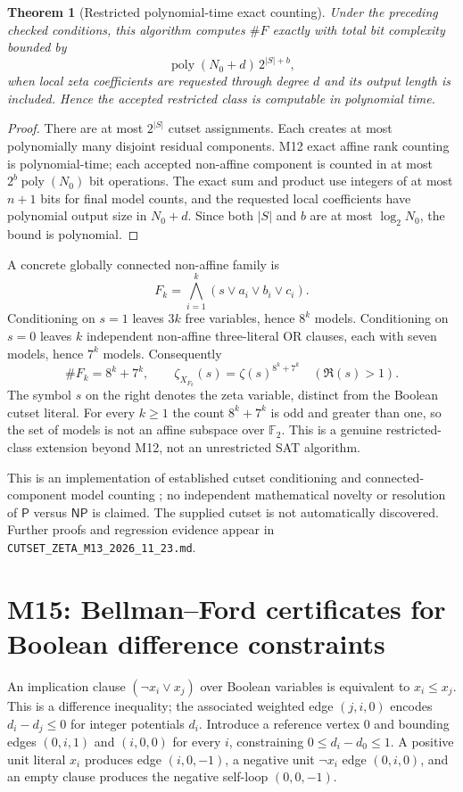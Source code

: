\documentclass[11pt,a4paper]{article}
\newtheorem{theorem}{Theorem}
\begin{document}
\begin{theorem}[Restricted polynomial-time exact counting]
Under the preceding checked conditions, this algorithm
computes $\#F$ exactly with total bit complexity bounded by
\[
\operatorname{poly}(N_0+d)\,2^{|S|+b},
\]
when local zeta coefficients are requested through degree
$d$ and its output length is included. Hence the accepted
restricted class is computable in polynomial time.
\end{theorem}
\begin{proof}
There are at most $2^{|S|}$ cutset assignments. Each creates
at most polynomially many disjoint residual components.
M12 exact affine rank counting is polynomial-time; each
accepted non-affine component is counted in at most
$2^b\operatorname{poly}(N_0)$ bit operations. The exact sum
and product use integers of at most $n+1$ bits for final
model counts, and the requested local coefficients have
polynomial output size in $N_0+d$. Since both $|S|$ and
$b$ are at most $\log_2N_0$, the bound is polynomial.
\end{proof}

A concrete globally connected non-affine family is
\[
F_k=\bigwedge_{i=1}^k
(s\lor a_i\lor b_i\lor c_i).
\]
Conditioning on $s=1$ leaves $3k$ free variables, hence
$8^k$ models. Conditioning on $s=0$ leaves $k$
independent non-affine three-literal OR clauses, each with
seven models, hence $7^k$ models. Consequently
\[
\#F_k=8^k+7^k,\qquad
\zeta_{X_{F_k}}(s)=\zeta(s)^{8^k+7^k}
\quad(\Re(s)>1).
\]
The symbol $s$ on the right denotes the zeta variable,
distinct from the Boolean cutset literal.
For every $k\ge1$ the count $8^k+7^k$ is odd and greater
than one, so the set of models is not an affine subspace
over $\mathbb F_2$. This is a genuine restricted-class
extension beyond M12, not an unrestricted SAT algorithm.

This is an implementation of established cutset
conditioning and connected-component model counting
\cite{bayardo,andorcutset}; no independent mathematical
novelty or resolution of $\mathsf P$ versus $\mathsf{NP}$
is claimed. The supplied cutset is not automatically
discovered. Further proofs and regression evidence appear
in \texttt{CUTSET\_ZETA\_M13\_2026\_11\_23.md}.

\section{M15: Bellman--Ford certificates for Boolean difference constraints}
An implication clause $(\neg x_i\lor x_j)$ over Boolean
variables is equivalent to $x_i\le x_j$. This is a difference
inequality; the associated weighted edge $(j,i,0)$ encodes
$d_i-d_j\le0$ for integer potentials $d_i$.
Introduce a reference vertex $0$ and bounding edges
$(0,i,1)$ and $(i,0,0)$ for every $i$, constraining
$0\le d_i-d_0\le1$. A positive unit literal $x_i$
produces edge $(i,0,-1)$, a negative unit $\neg x_i$
edge $(0,i,0)$, and an empty clause produces the negative
self-loop $(0,0,-1)$.
\end{document}
